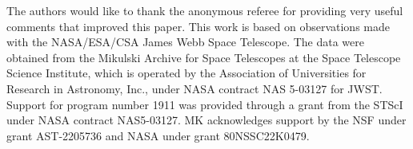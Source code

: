 \documentclass[twocolumn]{aastex631}
\begin{document}
\begin{acknowledgments}
The authors would like to thank the anonymous referee for providing very useful comments that improved this paper. This work is based on observations made with the NASA/ESA/CSA James Webb Space Telescope. The data were obtained from the Mikulski Archive for Space Telescopes at the Space Telescope Science Institute, which is operated by the Association of Universities for Research in Astronomy, Inc., under NASA contract NAS 5-03127 for JWST. Support for program number 1911 was provided through a grant from the STScI under NASA contract NAS5-03127. MK acknowledges support by the NSF under grant AST-2205736 and NASA under grant 80NSSC22K0479.

\end{acknowledgments}

{}

\end{document}
